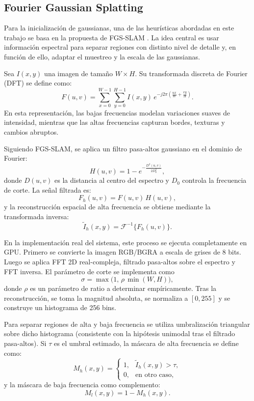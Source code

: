 \subsection{Fourier Gaussian Splatting}

Para la inicialización de gaussianas, una de las heurísticas abordadas en este trabajo se basa en la propuesta de FGS-SLAM \cite{xu2025fgsslamfourierbasedgaussiansplatting}. La idea central es usar información espectral para separar regiones con distinto nivel de detalle y, en función de ello, adaptar el muestreo y la escala de las gaussianas.

Sea $I(x,y)$ una imagen de tamaño $W \times H$. Su transformada discreta de Fourier (DFT) se define como:
\begin{equation}
F(u,v)=\sum_{x=0}^{W-1}\sum_{y=0}^{H-1} I(x,y)\, e^{-j2\pi(\frac{ux}{W}+\frac{vy}{H})}.
\end{equation}
En esta representación, las bajas frecuencias modelan variaciones suaves de intensidad, mientras que las altas frecuencias capturan bordes, texturas y cambios abruptos.

Siguiendo FGS-SLAM, se aplica un filtro pasa-altos gaussiano en el dominio de Fourier:
\begin{equation}
H(u,v)=1-e^{-\frac{D^2(u,v)}{2D_0^2}},
\end{equation}
donde $D(u,v)$ es la distancia al centro del espectro y $D_0$ controla la frecuencia de corte. La señal filtrada es:
\begin{equation}
F_h(u,v)=F(u,v)\,H(u,v),
\end{equation}
y la reconstrucción espacial de alta frecuencia se obtiene mediante la transformada inversa:
\begin{equation}
\tilde{I}_h(x,y)=\mathcal{F}^{-1}\{F_h(u,v)\}.
\end{equation}

En la implementación real del sistema, este proceso se ejecuta completamente en GPU. Primero se convierte la imagen RGB/BGRA a escala de grises de 8 bits. Luego se aplica FFT 2D real-compleja, filtrado pasa-altos sobre el espectro y FFT inversa. El parámetro de corte se implementa como
\begin{equation}
\sigma=\max\big(1,\,\rho\,\min(W,H)\big),
\end{equation}
donde $\rho$ es un parámetro de ratio a determinar empíricamente. Tras la reconstrucción, se toma la magnitud absoluta, se normaliza a $[0,255]$ y se construye un histograma de 256 bins.

Para separar regiones de alta y baja frecuencia se utiliza umbralización triangular sobre dicho histograma (consistente con la hipótesis unimodal tras el filtrado pasa-altos). Si $\tau$ es el umbral estimado, la máscara de alta frecuencia se define como:
\begin{equation}
M_h(x,y)=
\begin{cases}
1,& \tilde{I}_h(x,y)>\tau,\\
0,& \text{en otro caso,}
\end{cases}
\end{equation}
y la máscara de baja frecuencia como complemento:
\begin{equation}
M_l(x,y)=1-M_h(x,y).
\end{equation}

